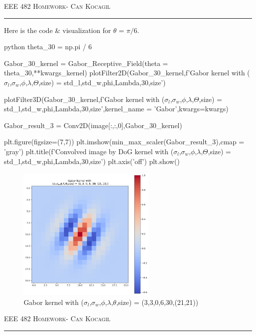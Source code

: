 \documentclass[12pt]{amsart}
\begin{document}
\newpage
{\scshape EEE 482} \hfill {\scshape \large  Homework-\relax} \hfill {\scshape Can Kocagil}
\smallskip
\hrule
\vspace{2mm}

Here is the code \& visualization for $\theta$ = $\pi/6$.
\begin{mintedbox}{python}
theta_30 = np.pi / 6

Gabor_30_kernel = Gabor_Receptive_Field(theta = theta_30,**kwargs_kernel)
plotFilter2D(Gabor_30_kernel,f'Gabor kernel with \n ($\sigma_l$,$\sigma_w$,$\phi$,$\lambda$,$\Theta$,size) = {std_l,std_w,phi,Lambda,30,size}')

plotFilter3D(Gabor_30_kernel,f'Gabor kernel with \n ($\sigma_l$,$\sigma_w$,$\phi$,$\lambda$,$\Theta$,size) = {std_l,std_w,phi,Lambda,30,size}',kernel_name = 'Gabor',kwargs=kwargs)


Gabor_result_3 = Conv2D(image[:,:,0],Gabor_30_kernel)


plt.figure(figsize=(7,7))
plt.imshow(min_max_scaler(Gabor_result_3),cmap = 'gray')
plt.title(f'Convolved image by DoG kernel with  \n ($\sigma_l$,$\sigma_w$,$\phi$,$\lambda$,$\Theta$,size) = {std_l,std_w,phi,Lambda,30,size}')
plt.axis('off')
plt.show()
\end{mintedbox}

\begin{figure}[ht]
    \centering
    \includegraphics[width = 0.6\textwidth]{images/Gabor_30_2d.png}
    \caption{Gabor kernel with ($\sigma_l$,$\sigma_w$,$\phi$,$\lambda$,$\theta$,size) = (3,3,0,6,30,(21,21))}
\end{figure}

\newpage
{\scshape EEE 482} \hfill {\scshape \large  Homework-\relax} \hfill {\scshape Can Kocagil}
\smallskip
\hrule
\vspace{2mm}
\end{document}
